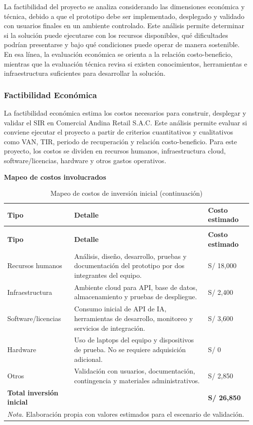 \documentclass[12pt,a4paper,oneside]{report}
\begin{document}
La factibilidad del proyecto se analiza considerando las dimensiones económica y técnica, debido a que el prototipo debe ser implementado, desplegado y validado con usuarios finales en un ambiente controlado. Este análisis permite determinar si la solución puede ejecutarse con los recursos disponibles, qué dificultades podrían presentarse y bajo qué condiciones puede operar de manera sostenible. En esa línea, la evaluación económica se orienta a la relación costo-beneficio, mientras que la evaluación técnica revisa si existen conocimientos, herramientas e infraestructura suficientes para desarrollar la solución.

\subsubsection{Factibilidad Económica}\label{subsubsec:factibilidad-economica}

La factibilidad económica estima los costos necesarios para construir, desplegar y validar el SIR en Comercial Andina Retail S.A.C. Este análisis permite evaluar si conviene ejecutar el proyecto a partir de criterios cuantitativos y cualitativos como VAN, TIR, periodo de recuperación y relación costo-beneficio. Para este proyecto, los costos se dividen en recursos humanos, infraestructura cloud, software/licencias, hardware y otros gastos operativos.

\textbf{Mapeo de costos involucrados}

\begin{longtable}{@{}p{}p{}p{}@{}}
\caption{Mapeo de costos de inversión inicial}\label{tab:mapeo-costos}\\
\toprule
\textbf{Tipo} & \textbf{Detalle} & \textbf{Costo estimado} \\
\midrule
\endfirsthead
\caption[]{Mapeo de costos de inversión inicial (continuación)}\\
\toprule
\textbf{Tipo} & \textbf{Detalle} & \textbf{Costo estimado} \\
\midrule
\endhead
Recursos humanos & Análisis, diseño, desarrollo, pruebas y documentación del prototipo por dos integrantes del equipo. & S/ 18,000 \\
Infraestructura & Ambiente cloud para API, base de datos, almacenamiento y pruebas de despliegue. & S/ 2,400 \\
Software/licencias & Consumo inicial de API de IA, herramientas de desarrollo, monitoreo y servicios de integración. & S/ 3,600 \\
Hardware & Uso de laptops del equipo y dispositivos de prueba. No se requiere adquisición adicional. & S/ 0 \\
Otros & Validación con usuarios, documentación, contingencia y materiales administrativos. & S/ 2,850 \\
\textbf{Total inversión inicial} & & \textbf{S/ 26,850} \\
\bottomrule
\multicolumn{3}{p{0.94\textwidth}}{\normalsize \textit{Nota.} Elaboración propia con valores estimados para el escenario de validación.}\\
\end{longtable}
\end{document}
